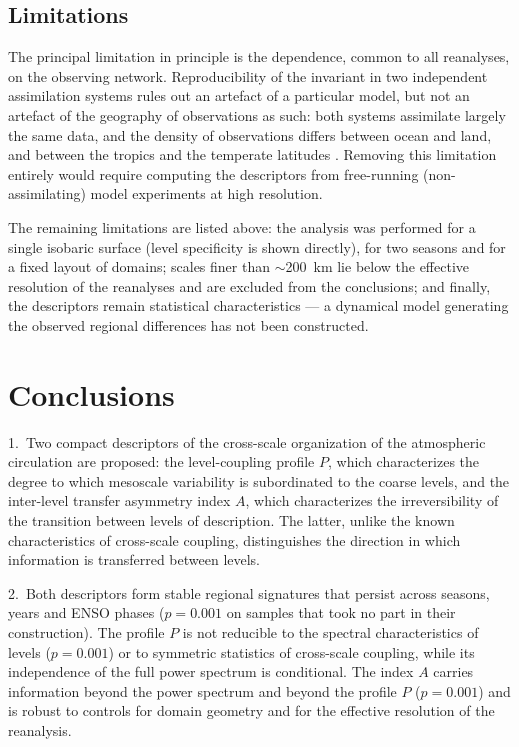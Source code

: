 \documentclass[11pt,a4paper]{article}
\begin{document}
\subsection{Limitations}

The principal limitation in principle is the dependence, common to all reanalyses, on the observing network. Reproducibility of the invariant in two independent assimilation systems rules out an artefact of a particular model, but not an artefact of the geography of observations as such: both systems assimilate largely the same data, and the density of observations differs between ocean and land, and between the tropics and the temperate latitudes \cite{BonavitaLaloyaux2020,Soci2024}. Removing this limitation entirely would require computing the descriptors from free-running (non-assimilating) model experiments at high resolution.

The remaining limitations are listed above: the analysis was performed for a single isobaric surface (level specificity is shown directly), for two seasons and for a fixed layout of domains; scales finer than $\sim$200~km lie below the effective resolution of the reanalyses and are excluded from the conclusions; and finally, the descriptors remain statistical characteristics --- a dynamical model generating the observed regional differences has not been constructed.

\section{Conclusions}
\label{sec:conclusion}

1.~Two compact descriptors of the cross-scale organization of the atmospheric circulation are proposed: the level-coupling profile $P$, which characterizes the degree to which mesoscale variability is subordinated to the coarse levels, and the inter-level transfer asymmetry index $A$, which characterizes the irreversibility of the transition between levels of description. The latter, unlike the known characteristics of cross-scale coupling, distinguishes the direction in which information is transferred between levels.

2.~Both descriptors form stable regional signatures that persist across seasons, years and ENSO phases ($p=0.001$ on samples that took no part in their construction). The profile $P$ is not reducible to the spectral characteristics of levels ($p=0.001$) or to symmetric statistics of cross-scale coupling, while its independence of the full power spectrum is conditional. The index $A$ carries information beyond the power spectrum and beyond the profile $P$ ($p=0.001$) and is robust to controls for domain geometry and for the effective resolution of the reanalysis.
\end{document}
